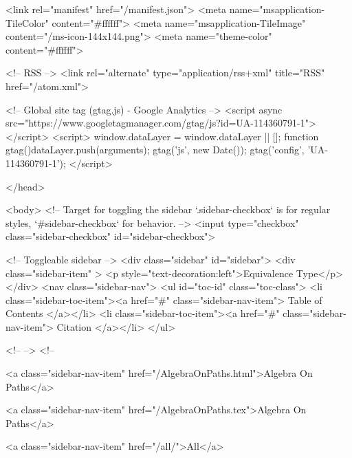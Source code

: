   <link rel="manifest" href="/manifest.json">
  <meta name="msapplication-TileColor" content="#ffffff">
  <meta name="msapplication-TileImage" content="/ms-icon-144x144.png">
  <meta name="theme-color" content="#ffffff">
  
  <!-- RSS -->
  <link rel="alternate" type="application/rss+xml" title="RSS" href="/atom.xml">

  <!-- Global site tag (gtag.js) - Google Analytics -->
  <script async src="https://www.googletagmanager.com/gtag/js?id=UA-114360791-1"></script>
  <script>
    window.dataLayer = window.dataLayer || [];
    function gtag(){dataLayer.push(arguments);}
    gtag('js', new Date());
    gtag('config', 'UA-114360791-1');
  </script>

  
</head>




  <body>
    <!-- Target for toggling the sidebar `.sidebar-checkbox` is for regular
     styles, `#sidebar-checkbox` for behavior. -->
<input type="checkbox" class="sidebar-checkbox" id="sidebar-checkbox">

<!-- Toggleable sidebar -->
<div class="sidebar" id="sidebar">
  <div class="sidebar-item" >
    <p style="text-decoration:left">Equivalence Type</p>
  </div>
  <nav class="sidebar-nav">
    <ul id="toc-id" class="toc-class">
  <li class="sidebar-toc-item"><a href="#" class="sidebar-nav-item"> Table of Contents </a></li>
  <li class="sidebar-toc-item"><a href="#" class="sidebar-nav-item"> Citation </a></li>
</ul>


    <!--  -->
    <!-- 
      
    
      
    
      
    
      
        
      
    
      
        
          <a class="sidebar-nav-item" href="/AlgebraOnPaths.html">Algebra On Paths</a>
        
      
    
      
        
          <a class="sidebar-nav-item" href="/AlgebraOnPaths.tex">Algebra On Paths</a>
        
      
    
      
        
          <a class="sidebar-nav-item" href="/all/">All</a>
        
      
    
      
        
